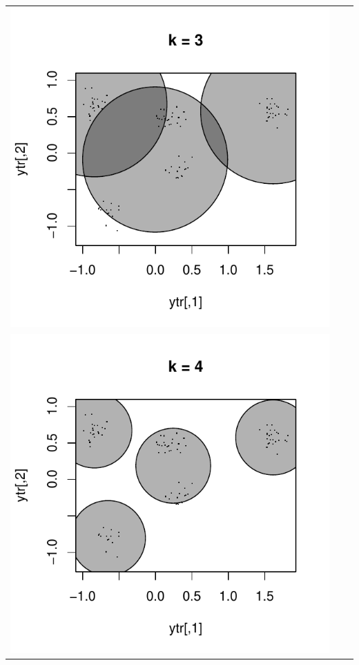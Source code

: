 \documentclass{beamer}
\begin{document}
\begin{frame}
\begin{center}
\begin{tabular}{ccc}
\includegraphics[scale = \scalesize, clip = true, trim = 0.3in 0.4in 0.3in 0.2in]{../conformal_kmeans/k3.pdf} \\
\includegraphics[scale = \scalesize, clip = true, trim = 0.3in 0.4in 0.3in 0.2in]{../conformal_kmeans/k4.pdf} &

\end{tabular}
\end{center}
\end{frame}
\end{document}
